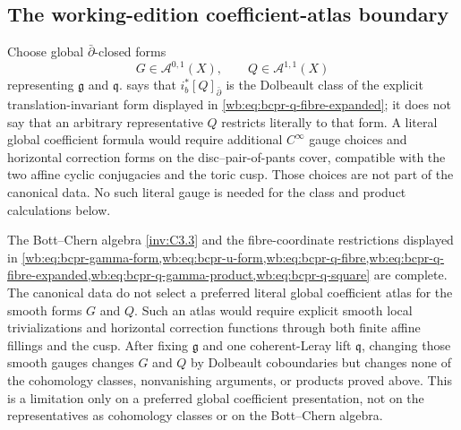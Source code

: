 \subsection{The working-edition coefficient-atlas boundary}
\begin{remark}
\label{wb:rem:bcpr-literal-gauge}
Choose global $\bar\partial$-closed forms
\begin{equation}
 G\in\mathcal A^{0,1}(X),\qquad
 Q\in\mathcal A^{1,1}(X)

\end{equation}
representing $\mathfrak g$ and $\mathfrak q$.
 says that
$i_b^*[Q]_{\bar\partial}$ is the Dolbeault class of the explicit
translation-invariant
form displayed in \cref{wb:eq:bcpr-q-fibre-expanded}; it does not say that an arbitrary
representative $Q$ restricts literally to that form.  A literal global
coefficient formula would require additional $C^\infty$ gauge choices and
horizontal correction forms on the disc--pair-of-pants cover, compatible
with the two affine cyclic conjugacies and the toric cusp.  Those choices
are not part of the canonical data.  No such literal gauge is needed for
the class and product calculations below.
\end{remark}
\begin{remark}
\label{wb:rem:bcpr-global-gauge-boundary}
The Bott--Chern algebra \cref{inv:C3.3} and the fibre-coordinate
restrictions displayed in
\cref{wb:eq:bcpr-gamma-form,wb:eq:bcpr-u-form,wb:eq:bcpr-q-fibre,wb:eq:bcpr-q-fibre-expanded,wb:eq:bcpr-q-gamma-product,wb:eq:bcpr-q-square}
are complete.  The canonical data do not select a preferred literal global
coefficient atlas for the smooth forms $G$ and $Q$.  Such an atlas would
require explicit smooth local trivializations and horizontal correction
functions through both finite affine fillings and the cusp.  After fixing
$\mathfrak g$ and one coherent-Leray lift $\mathfrak q$, changing those
smooth gauges changes $G$ and $Q$ by Dolbeault coboundaries but changes
none of the cohomology classes, nonvanishing arguments, or products proved
above.  This is a limitation only on a preferred global coefficient
presentation, not on the representatives as cohomology classes or on the
Bott--Chern algebra.
\end{remark}
